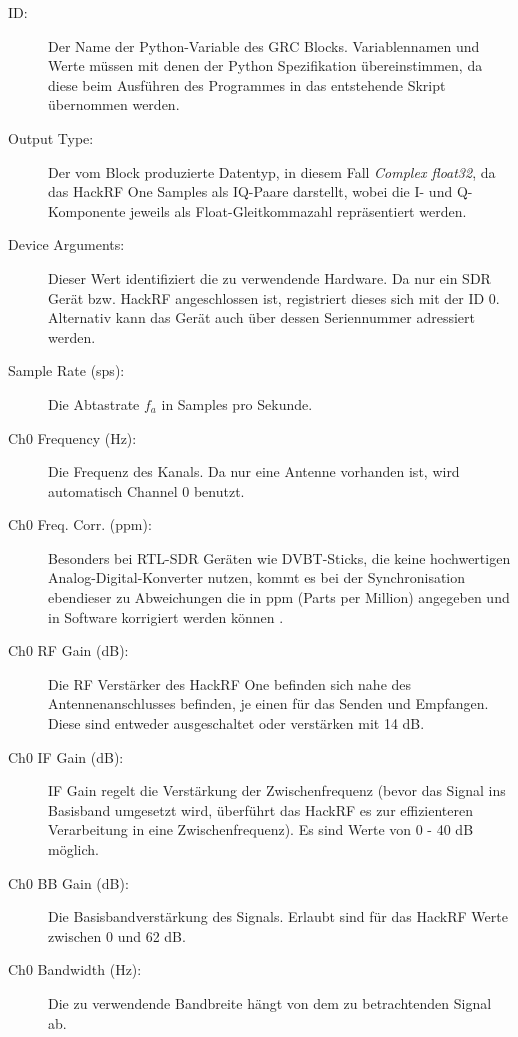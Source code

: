 \begin{description}
	\item[ID:] Der Name der Python-Variable des GRC Blocks. Variablennamen und Werte müssen mit denen der Python Spezifikation übereinstimmen, da diese beim Ausführen des Programmes in das entstehende Skript übernommen werden.
	\item[Output Type:] Der vom Block produzierte Datentyp, in diesem Fall \textit{Complex float32}, da das HackRF One Samples als IQ-Paare darstellt, wobei die I- und Q-Komponente jeweils als Float-Gleitkommazahl repräsentiert werden.
	\item[Device Arguments:] Dieser Wert identifiziert die zu verwendende Hardware. Da nur ein SDR Gerät bzw. HackRF angeschlossen ist, registriert dieses sich mit der ID 0. Alternativ kann das Gerät auch über dessen Seriennummer adressiert werden.
	\item [Sample Rate (sps):] Die Abtastrate $f_a$ in Samples pro Sekunde.
	\item[Ch0 Frequency (Hz):] Die Frequenz des Kanals. Da nur eine Antenne vorhanden ist, wird automatisch Channel 0 benutzt.
	\item[Ch0 Freq. Corr. (ppm):] Besonders bei RTL-SDR Geräten wie DVBT-Sticks, die keine hochwertigen Analog-Digital-Konverter nutzen, kommt es bei der Synchronisation ebendieser zu Abweichungen die in ppm (Parts per Million) angegeben und in Software korrigiert werden können \cite[vgl. Whiting, e. a., S.1]{ppm}.
	\item[Ch0 RF Gain (dB):] Die \ac{RF} Verstärker des HackRF One befinden sich nahe des Antennenanschlusses befinden, je einen für das Senden und Empfangen. Diese sind entweder ausgeschaltet oder verstärken mit 14 dB.
	\item[Ch0 IF Gain (dB):] \ac{IF} Gain regelt die Verstärkung der Zwischenfrequenz (bevor das Signal ins Basisband umgesetzt wird, überführt das HackRF es zur effizienteren Verarbeitung in eine Zwischenfrequenz). Es sind Werte von 0 - 40 dB möglich.
	\item[Ch0 BB Gain (dB):] Die Basisbandverstärkung des Signals. Erlaubt sind für das HackRF Werte zwischen 0 und 62 dB.
	\item[Ch0 Bandwidth (Hz):] Die zu verwendende Bandbreite hängt von dem zu betrachtenden Signal ab. 
\end{description}






